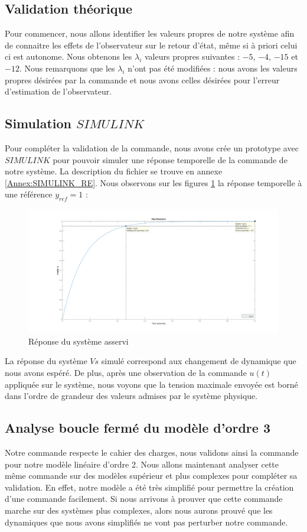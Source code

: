 \subsection{Validation théorique}
Pour commencer, nous allons identifier les valeurs propres de notre système afin de connaitre les effets de l'observateur sur le retour d'état, même si à priori celui ci est autonome. Nous obtenons les $\lambda_i$ valeurs propres suivantes : $-5$, $-4$, $-15$ et $-12$. Nous remarquons que les $\lambda_i$ n'ont pas été modifiées : nous avons les valeurs propres désirées par la commande et nous avons celles désirées pour l'erreur d'estimation de l'observateur. 

\subsection{Simulation $SIMULINK$}
Pour compléter la validation de la commande, nous avons crée un prototype avec $SIMULINK$ pour pouvoir simuler une réponse temporelle de la commande de notre système. La description du fichier se trouve en annexe \ref{Annex:SIMULINK_RE}. Nous observons sur les figures \ref{fig:reponsesSysAsservi} la réponse temporelle à une référence $y_{ref} = 1$ : 
\begin{figure}[!ht]
\begin{center}
\includegraphics[width = \textwidth]{./III/figure/stepEE2bf.png}
\caption{Réponse du système asservi\label{fig:reponsesSysAsservi}}
\end{center}
\end{figure}
La réponse du système $Vs$ simulé correspond aux changement de dynamique que nous avons espéré. De plus, après une observation de la commande $u(t)$ appliquée sur le système, nous voyons que la tension maximale envoyée est borné dans l'ordre de grandeur des valeurs admises par le système physique. 


\subsection{Analyse boucle fermé du modèle d'ordre 3}
Notre commande respecte le cahier des charges, nous validons ainsi la commande pour notre modèle linéaire d'ordre 2. Nous allons maintenant analyser cette même commande sur des modèles supérieur et plus complexes pour compléter sa validation. En effet, notre modèle a été très simplifié pour permettre la création d'une commande facilement. Si nous arrivons à prouver que cette commande marche sur des systèmes plus complexes, alors nous aurons prouvé que les dynamiques que nous avons simplifiés ne vont pas perturber notre commande.

